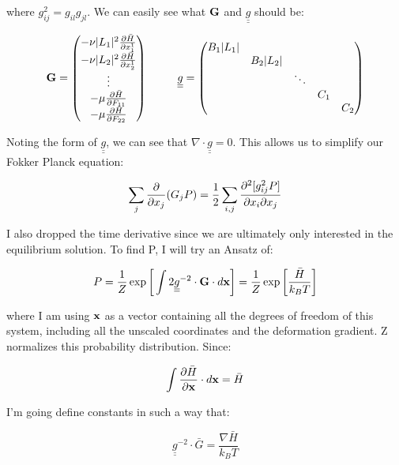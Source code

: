 \documentclass[12pt]{article}
\begin{document}
where $g_{ij}^2 = g_{il} g_{jl}$. We can easily see what $\vb{G}$ and $\underline{\underline{g}}$ should be: 
\begin{center}
\begin{equation}
\vb{G} = \mqty( -\nu |L_1|^2 \pdv{\bar{H}}{x_1^1}\\ -\nu |L_2|^2 \pdv{\bar{H}}{x_2^1}\\ \vdots\\ -\mu \pdv{\bar{H}}{F_{11}}\\ -\mu \pdv{\bar{H}}{F_{22}}) \hspace{1cm} \underline{\underline{g}} = \mqty(\dmat{B_1 |L_1|, B_2 |L_2|, \ddots, C_1, C_2 })
\end{equation}
\end{center}
Noting the form of $\underline{\underline{g}}$, we can see that $\nabla \cdot {\underline{\underline{g}}} = 0$. This allows us to simplify our Fokker Planck equation:
\begin{center}
\begin{equation}
\label{eqn: ansatz}
\sum\limits_j \pdv{x_j} (G_j P) = \frac{1}{2}\sum\limits_{i,j} \pdv{[g_{ij}^2 P]}{x_i}{x_j} 
\end{equation}
\end{center} 
I also dropped the time derivative since we are ultimately only interested in the equilibrium solution. To find P, I will try an Ansatz of:
\begin{center}
\begin{equation}
\label{eqn: boltzmann}
P = \frac{1}{Z} \exp\bigg[\int 2  \underline{\underline{g}}^{-2} \cdot \vb{G} \cdot d{\vb{x}} \bigg] = \frac{1}{Z} \exp\bigg[\frac{\bar{H}}{k_B T}\bigg]
\end{equation}
\end{center}
where I am using $\vb{x}$ as a vector containing all the degrees of freedom of this system, including all the unscaled coordinates and the deformation gradient. Z normalizes this probability distribution.  Since:
\begin{center}
\begin{equation}
\label{eqn: lineint}
\int \pdv{\bar{H}}{\vb{x}}\cdot d\vb{x} = \bar{H}
\end{equation}
\end{center}
I'm going define constants in such a way that:
\begin{center}
\begin{equation}
\label{eqn: gG}
\underline{\underline{g}}^{-2}\cdot\bar{G} = \frac{\nabla \bar{H}}{k_B T}
\end{equation}
\end{center}
\end{document}
